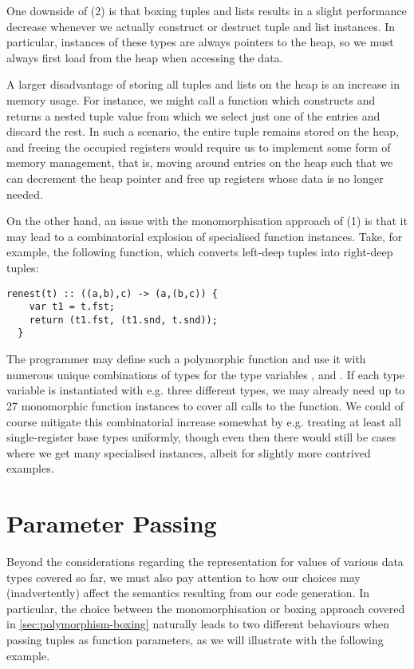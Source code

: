 One downside of (2) is that boxing tuples and lists results in a slight
performance decrease whenever we actually construct or destruct tuple and list
instances. In particular, instances of these types are always pointers to the
heap, so we must always first load from the heap when accessing the data.

A larger disadvantage of storing all tuples and lists on the heap is an increase
in memory usage. For instance, we might call a function which constructs and
returns a nested tuple value from which we select just one of the entries and
discard the rest.
In such a scenario, the entire tuple remains stored on the heap, and freeing the
occupied registers would require us to implement some form of memory management,
that is, moving around entries on the heap such that we can decrement the heap
pointer and free up registers whose data is no longer needed.

On the other hand, an issue with the monomorphisation approach of (1) is that it
may lead to a combinatorial explosion of specialised function instances.
Take, for example, the following function, which converts left-deep tuples into
right-deep tuples:
\begin{lstlisting}[language=spl]
  renest(t) :: ((a,b),c) -> (a,(b,c)) {
    var t1 = t.fst;
    return (t1.fst, (t1.snd, t.snd));
  }
\end{lstlisting}
%
The programmer may define such a polymorphic function and use it with numerous
unique combinations of types for the type variables ,  and
. If each type variable is instantiated with e.g. three different types,
we may already need up to 27 monomorphic function instances to cover all calls
to the  function.
We could of course mitigate this combinatorial increase somewhat by e.g.
treating at least all single-register base types uniformly, though even then
there would still be cases where we get many specialised instances, albeit for
slightly more contrived examples.


\section{Parameter Passing} \label{sec:codegen-param-passing}
Beyond the considerations regarding the representation for values of various
data types covered so far, we must also pay attention to how our choices may
(inadvertently) affect the semantics resulting from our code generation.
In particular, the choice between the monomorphisation or boxing approach
covered in \cref{sec:polymorphism-boxing} naturally leads to two different
behaviours when passing tuples as function parameters, as we will illustrate
with the following example.

